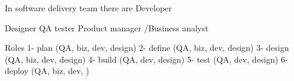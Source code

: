 In software delivery team there are 
  Developer 
    
  Designer 
  QA tester 
  Product manager /Business analyst 

Roles 
  1- plan     (QA, biz, dev, design)
  2- define   (QA, biz, dev, design)
  3- design   (QA, biz, dev, design)
  4- build    (QA, dev, design)
  5- test     (QA, dev, design)
  6- deploy   (QA, biz, dev, )
